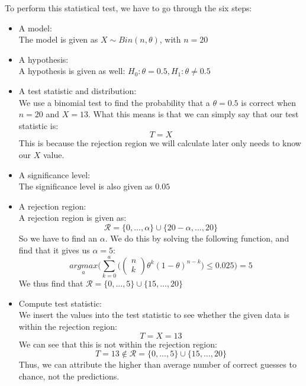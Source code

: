 To perform this statistical test, we have to go through the six steps:
\begin{itemize}
\item A model: \\
The model is given as $X \sim Bin(n,\theta)$, with $n = 20$
\item A hypothesis: \\
A hypothesis is given as well: $H_0: \theta = 0.5, H_1: \theta \neq 0.5$
\item A test statistic and distribution: \\
We use a binomial test to find the probability that a $\theta = 0.5$ is correct when $n = 20$ and $X = 13$. What this means is that we can simply say that our test statistic is:
$$
T = X
$$
This is because the rejection region we will calculate later only needs to know our $X$ value.
\item A significance level: \\
The significance level is also given as $0.05$
\item A rejection region: \\
A rejection region is given as:
$$
\mathcal{R}=\{0,...,\alpha\}\cup\{20-\alpha,...,20\}
$$
So we have to find an $\alpha$. We do this by solving the following function, and find that it gives us $\alpha = 5$:
$$
\underset{a}{argmax} \Bigg(\sum_{k=0}^a\Bigg(\begin{pmatrix} n \\ k \end{pmatrix} \theta^k (1-\theta)^{n-k}\Bigg) \leq 0.025 \Bigg) = 5
$$
We thus find that $\mathcal{R}=\{0,...,5\}\cup\{15,...,20\}$
\item Compute test statistic: \\
We insert the values into the test statistic to see whether the given data is within the rejection region:
$$
T = X = 13
$$
We can see that this is not within the rejection region:
$$
T = 13 \not\in \mathcal{R} = \{0,...,5\} \cup \{15,...,20\}
$$
Thus, we can attribute the higher than average number of correct guesses to chance, not the predictions.
\end{itemize}